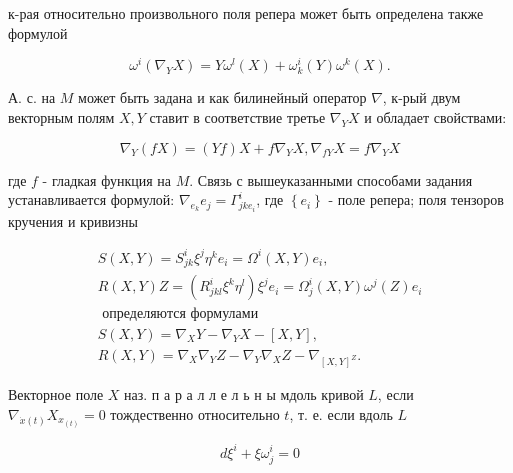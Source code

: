 \documentclass[10pt]{article}
\begin{document}
к-рая относительно произвольного поля репера может быть определена также формулой



\[

\omega^{i}\left(\nabla_{Y} X\right)=Y \omega^{l}(X)+\omega_{k}^{i}(Y) \omega^{k}(X) .

\]



А. с. на $M$ может быть задана и как билинейный оператор $\nabla$, к-рый двум векторным полям $X, Y$ ставит в соответствие третье $\nabla_{Y} X$ и обладает свойствами:



\[

\nabla_{Y}(f X)=(Y f) X+f \nabla_{Y} X, \nabla_{f Y} X=f \nabla_{Y} X

\]



где $f$ - гладкая функция на $M$. Связь с вышеуказанными способами задания устанавливается формулой: $\nabla_{e_{k}} e_{j}=\Gamma_{j k e_{i}}^{i}$, где $\left\{e_{i}\right\}$ - поле репера; поля тензоров кручения и кривизны



\[

\begin{gathered}

S(X, Y)=S_{j k}^{i} \xi^{j} \eta^{k} e_{i}=\Omega^{i}(X, Y) e_{i}, \\

R(X, Y) Z=\left(R_{j k l}^{i} \xi^{k} \eta^{l}\right) \xi^{j} e_{i}=\Omega_{j}^{i}(X, Y) \omega^{j}(Z) e_{i} \\

\text { определяются формулами } \\

S(X, Y)=\nabla_{X} Y-\nabla_{Y} X-[X, Y], \\

R(X, Y)=\nabla_{X} \nabla_{Y} Z-\nabla_{Y} \nabla_{X} Z-\nabla_{[X, Y]^{Z}} .

\end{gathered}

\]



Векторное поле $X$ наз. п а р а л л е л ь н ы мдоль кривой $L$, если $\nabla_{\dot{x}(t)} X_{x_{(t)}}=0$ тождественно относительно $t$, т. е. если вдоль $L$



\[

d \xi^{i}+\xi \omega_{j}^{i}=0

\]
\end{document}
